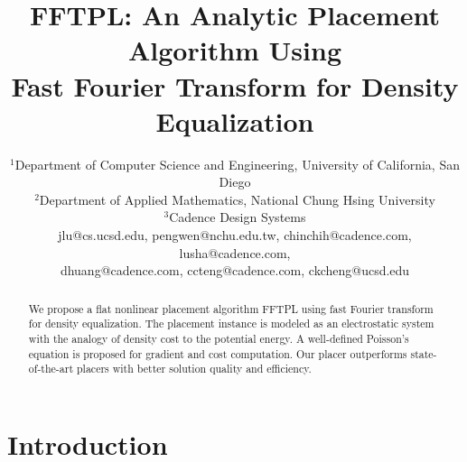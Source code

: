 \documentclass[conference,10pt]{IEEEtran}
\newcounter{def}
\begin{document}
\title{\huge \bf FFTPL: An Analytic Placement Algorithm Using \\ Fast Fourier Transform for Density Equalization}





\author{
\IEEEauthorblockA
{$^1$Department of Computer Science and Engineering, University of California, San Diego \\
$^2$Department of Applied Mathematics, National Chung Hsing University \\
$^3$Cadence Design Systems \\
jlu@cs.ucsd.edu, pengwen@nchu.edu.tw, chinchih@cadence.com, lusha@cadence.com, \\
dhuang@cadence.com, ccteng@cadence.com, ckcheng@ucsd.edu\\}}
\maketitle
\thispagestyle{empty}
\renewcommand{\headrulewidth}{0pt}
\begin{abstract}
\label{sec:abs}
We propose a flat nonlinear placement algorithm FFTPL
using fast Fourier transform for density equalization.
The placement instance is modeled as an electrostatic system 
with the analogy of density cost to the potential energy.
A well-defined Poisson's equation is proposed for 
gradient and cost computation.
Our placer outperforms state-of-the-art placers 
with better solution quality and efficiency.
\end{abstract}



\section{Introduction}
\label{sec:intro}
\end{document}
